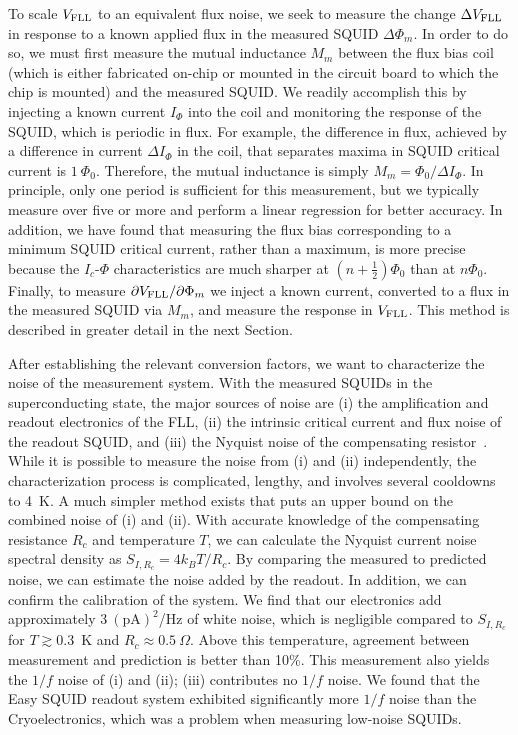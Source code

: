 To scale $V_\text{FLL}$ to an equivalent flux noise, we seek to measure the change $\Delta V_\text{FLL}$ in response to a known applied flux in the measured SQUID $\Delta\Phi_m$. In order to do so, we must first measure the mutual inductance $M_m$ between the flux bias coil (which is either fabricated on-chip or mounted in the circuit board to which the chip is mounted) and the measured SQUID. We readily accomplish this by injecting a known current $I_\Phi$ into the coil and monitoring the response of the SQUID, which is periodic in flux. For example, the difference in flux, achieved by a difference in current $\Delta I_\Phi$ in the coil, that separates maxima in SQUID critical current is $1~\Phi_0$. Therefore, the mutual inductance is simply $M_m = \Phi_0/\Delta I_\Phi$. In principle, only one period is sufficient for this measurement, but we typically measure over five or more and perform a linear regression for better accuracy. In addition, we have found that measuring the flux bias corresponding to a minimum SQUID critical current, rather than a maximum, is more precise because the $I_c$-$\Phi$ characteristics are much sharper at $(n+\tfrac{1}{2})\Phi_0$ than at $n\Phi_0$. Finally, to measure $\partial V_\text{FLL}/\partial\Phi_m$ we inject a known current, converted to a flux in the measured SQUID via $M_m$, and measure the response in $V_\text{FLL}$. This method is described in greater detail in the next Section.

After establishing the relevant conversion factors, we want to characterize the noise of the measurement system. With the measured SQUIDs in the superconducting state, the major sources of noise are (i) the amplification and readout electronics of the FLL, (ii) the intrinsic critical current and flux noise of the readout SQUID, and (iii) the Nyquist noise of the compensating resistor~\citep{Nyquist:PR:1928}. While it is possible to measure the noise from (i) and (ii) independently, the characterization process is complicated, lengthy, and involves several cooldowns to 4~K. A much simpler method exists that puts an upper bound on the combined noise of (i) and (ii). With accurate knowledge of the compensating resistance $R_c$ and temperature $T$, we can calculate the Nyquist current noise spectral density as $S_{I,R_c} = 4 k_B T/R_c$. By comparing the measured to predicted noise, we can estimate the noise added by the readout. In addition, we can confirm the calibration of the system. We find that our electronics add approximately $3~(\text{pA})^2$/Hz of white noise, which is negligible compared to $S_{I,R_c}$ for $T \gtrsim 0.3$~K and $R_c \approx 0.5~\Omega$. Above this temperature, agreement between measurement and prediction is better than 10\%. This measurement also yields the $1/f$ noise of (i) and (ii); (iii) contributes no $1/f$ noise. We found that the Easy SQUID readout system exhibited significantly more $1/f$ noise than the Cryoelectronics, which was a problem when measuring low-noise SQUIDs.


